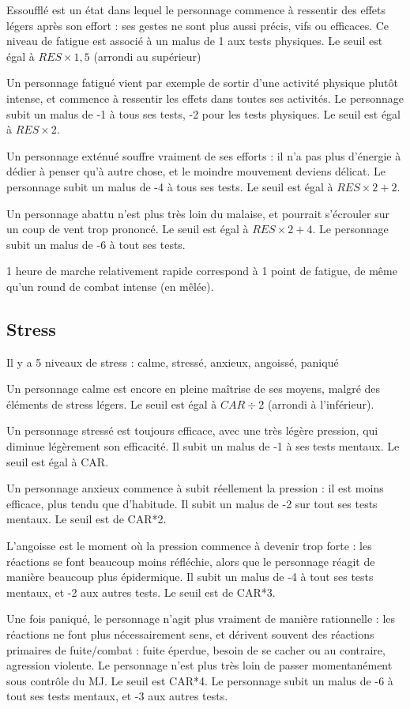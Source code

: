 \documentclass[10pt,a4paper,twocolumn]{book}
\begin{document}
Essoufflé est un état dans lequel le personnage commence à ressentir des effets légers après son effort : ses gestes ne sont plus aussi précis, vifs ou efficaces. Ce niveau de fatigue est associé à un malus de 1 aux tests physiques. Le seuil est égal à $RES\times 1,5$ (arrondi au supérieur)

Un personnage fatigué vient par exemple de sortir d'une activité physique plutôt intense, et commence à ressentir les effets dans toutes ses activités. Le personnage subit un malus de -1 à tous ses tests, -2 pour les tests physiques. Le seuil est égal à $RES\times 2$.

Un personnage exténué souffre vraiment de ses efforts : il n'a pas plus d'énergie à dédier à penser qu'à autre chose, et le moindre mouvement deviens délicat. Le personnage subit un malus de -4 à tous ses tests. Le seuil est égal à $RES\times 2+2$.

Un personnage abattu n'est plus très loin du malaise, et pourrait s'écrouler sur un coup de vent trop prononcé. Le seuil est égal à $RES\times 2+4$. Le personnage subit un malus de -6 à tout ses tests.

1 heure de marche relativement rapide correspond à 1 point de fatigue, de même qu'un round de combat intense (en mêlée).
\subsection{Stress}
Il y a 5 niveaux de stress : calme, stressé, anxieux, angoissé, paniqué

Un personnage calme est encore en pleine maîtrise de ses moyens, malgré des éléments de stress légers. Le seuil est égal à $CAR\div2$ (arrondi à l'inférieur).

Un personnage stressé est toujours efficace, avec une très légère pression, qui diminue légèrement son efficacité. Il subit un malus de -1 à ses tests mentaux. Le seuil est égal à CAR.

Un personnage anxieux commence à subit réellement la pression : il est moins efficace, plus tendu que d'habitude. Il subit un malus de -2 sur tout ses tests mentaux. Le seuil est de CAR*2.

L'angoisse est le moment où la pression commence à devenir trop forte : les réactions se font beaucoup moins réfléchie, alors que le personnage réagit de manière beaucoup plus épidermique. Il subit un malus de -4 à tout ses tests mentaux, et -2 aux autres tests. Le seuil est de CAR*3.

Une fois paniqué, le personnage n'agit plus vraiment de manière rationnelle : les réactions ne font plus nécessairement sens, et dérivent souvent des réactions primaires de fuite/combat : fuite éperdue, besoin de se cacher ou au contraire, agression violente. Le personnage n'est plus très loin de passer momentanément sous contrôle du MJ. Le seuil est CAR*4. Le personnage subit un malus de -6 à tout ses tests mentaux, et -3 aux autres tests.
\end{document}
